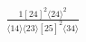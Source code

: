 \documentclass[varwidth, border=5pt]{standalone}
\begin{document}
\begin{my}
$\begin{gathered}
\scriptscriptstyle\frac{1[24]^2⟨24⟩^2}{⟨14⟩⟨23⟩[25]^2⟨34⟩}
\end{gathered}$
\end{my}
\end{document}
